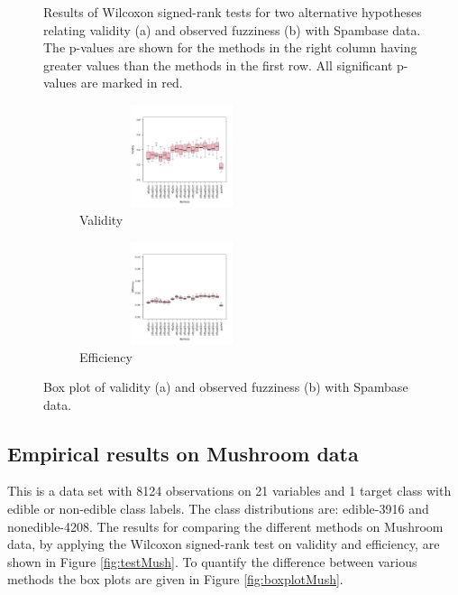 \documentclass[main]{subfiles}
\begin{document}
\begin{figure}[h]
\begin{subfigure}{.5\textwidth}
\end{subfigure}%
\caption{Results of Wilcoxon signed-rank tests for two alternative hypotheses relating validity (a) and observed fuzziness (b) with Spambase data. The p-values are shown for the methods in the right column having greater values than the methods in the first row. All significant p-values are marked in red.}
\label{fig:testSpam}
\end{figure}

\begin{figure}[h]
\centering
\begin{subfigure}{.5\textwidth}
  \centering
  \includegraphics[width=6cm,height=3cm]{images/boxplotSpam}
  \caption{Validity}
  \label{fig:boxplotValBC}
\end{subfigure}%
\begin{subfigure}{.5\textwidth}
  \centering
  \includegraphics[width=6cm,height=3cm]{images/boxplotSpam_eff}
  \caption{Efficiency}
  \label{fig:boxplotEffBC}
\end{subfigure}%
\caption{Box plot of validity (a) and observed fuzziness (b) with Spambase data.} \label{fig:boxplotSpam}
\end{figure}

\subsection{Empirical results on Mushroom data}
This is a data set with 8124 observations on 21 variables and 1 target class with edible or non-edible class labels. The class distributions are: edible-3916 and nonedible-4208.
The results for comparing the different methods on Mushroom data, by applying the Wilcoxon signed-rank test on validity and efficiency, are shown in Figure \ref{fig:testMush}. To quantify the difference between various methods the box plots are given in Figure \ref{fig:boxplotMush}.
\end{document}
